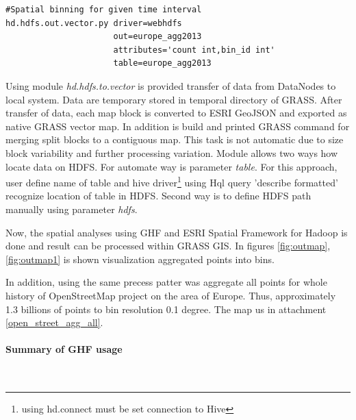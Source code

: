 \documentclass[a4paper,12pt,oneside]{report}
\begin{document}
\begin{footnotesize}
	\begin{lstlisting}[style=python]
#Spatial binning for given time interval
hd.hdfs.out.vector.py driver=webhdfs
                      out=europe_agg2013 
                      attributes='count int,bin_id int' 
                      table=europe_agg2013
	\end{lstlisting}
\end{footnotesize}
	Using module \textit{hd.hdfs.to.vector} is provided transfer of data from DataNodes to local system. Data are temporary stored in temporal directory of GRASS. After transfer of data, each 
	map block is converted to ESRI GeoJSON and exported as native GRASS vector map. In addition is build and printed GRASS command for merging split blocks to a contiguous map. This task is not automatic due to size block variability  and further processing variation. Module allows two
	 ways how locate data on HDFS. For automate way is parameter \textit{table}. For this approach, user
	 define name of table and hive driver\footnote{using hd.connect must be set connection to Hive} using Hql query 'describe formatted' recognize location of table in HDFS.
	 Second way is to define HDFS path manually using parameter \textit{hdfs}.
	
	Now, the spatial analyses using GHF and ESRI Spatial Framework for Hadoop is done and result can be processed within GRASS GIS. In figures \ref{fig:outmap}, \ref{fig:outmap1} is shown visualization aggregated points into bins.
	

	 In addition, using the same precess patter was aggregate all points for whole history of OpenStreetMap project on the area of Europe. Thus, approximately 1.3 billions  of points  to bin  resolution 0.1 degree. The map us in attachment \ref{open_street_agg_all}. 
	
	
	
	\paragraph{Summary of GHF usage}
~ %
		
		
		
\end{document}
